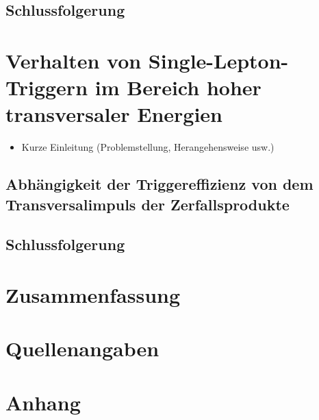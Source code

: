 \documentclass[12pt,a4paper]{article}
\begin{document}
\subsection{Schlussfolgerung}
\section{Verhalten von Single-Lepton-Triggern im Bereich hoher transversaler Energien}
\begin{itemize}
\item Kurze Einleitung (Problemstellung, Herangehensweise usw.)
\end{itemize}
\subsection{Abhängigkeit der Triggereffizienz von dem Transversalimpuls der Zerfallsprodukte}
\subsection{Schlussfolgerung}
\section{Zusammenfassung}
\section{Quellenangaben}
\section{Anhang}
\end{document}
